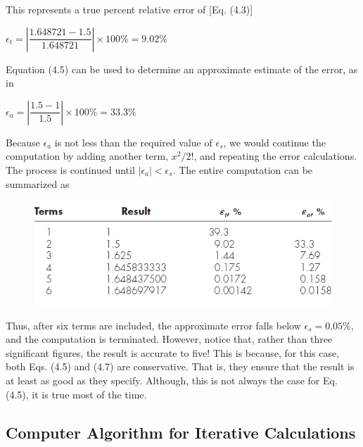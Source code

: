 \documentclass[../main.tex]{subfiles}
\begin{document}
\begin{example}
    \noindent
    This represents a true percent relative error of [Eq. (4.3)]
    \newline

    $\epsilon_t = \left\lvert\dfrac{1.648721-1.5}{1.648721}\right\rvert\times100\%=9.02\%$
    \newline

    \noindent
    Equation (4.5) can be used to determine an approximate estimate of the error, as in
    \newline

    $\epsilon_a = \left\lvert\dfrac{1.5-1}{1.5}\right\rvert\times100\%=33.3\%  $
    \newline

    \noindent
    Because ${\epsilon_a}$ is not less than the required value of $\epsilon_s$, we would continue the computation by
    adding another term, $x^2/2!$, and repeating the error calculations. The process is continued
    until $\left\lvert\epsilon_a \right\rvert < \epsilon_s$. The entire computation can be summarized as
    \newline

    \begin{figure}[h]
        \includegraphics{./images/fig_4_1_1}
    \end{figure}

    \noindent
    Thus, after six terms are included, the approximate error falls below $\epsilon_s=0.05\%$, and the
    computation is terminated. However, notice that, rather than three significant figures, the
    result is accurate to five! This is because, for this case, both Eqs. (4.5) and (4.7) are conservative.
    That is, they ensure that the result is at least as good as they specify. Although,
    this is not always the case for Eq. (4.5), it is true most of the time.\\
\end{example}

\subsection{Computer Algorithm for Iterative Calculations}
\end{document}
